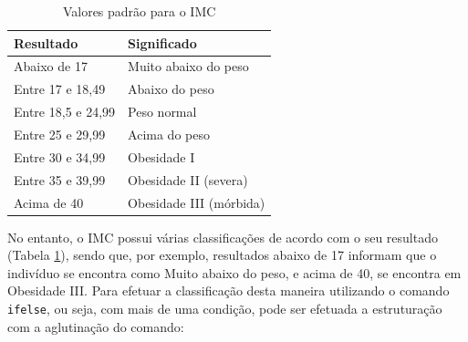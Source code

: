 \documentclass[12pt,brazil,]{book}
\newenvironment{Shaded}{\begin{snugshade}}{\end{snugshade}}
\newcommand{\DecValTok}[1]{\textcolor[rgb]{0.00,0.00,0.81}{#1}}
\newcommand{\FloatTok}[1]{\textcolor[rgb]{0.00,0.00,0.81}{#1}}
\newcommand{\KeywordTok}[1]{\textcolor[rgb]{0.13,0.29,0.53}{\textbf{#1}}}
\newcommand{\NormalTok}[1]{#1}
\newcommand{\OperatorTok}[1]{\textcolor[rgb]{0.81,0.36,0.00}{\textbf{#1}}}
\newcommand{\StringTok}[1]{\textcolor[rgb]{0.31,0.60,0.02}{#1}}
\begin{document}
\begin{table}

\caption{\label{tab:imct}Valores padrão para o IMC}
\centering
\begin{tabular}[t]{l|l}
\hline
Resultado & Significado\\
\hline
Abaixo de 17 & Muito abaixo do peso\\
\hline
Entre 17 e 18,49 & Abaixo do peso\\
\hline
Entre 18,5 e 24,99 & Peso normal\\
\hline
Entre 25 e 29,99 & Acima do peso\\
\hline
Entre 30 e 34,99 & Obesidade I\\
\hline
Entre 35 e 39,99 & Obesidade II (severa)\\
\hline
Acima de 40 & Obesidade III (mórbida)\\
\hline
\end{tabular}
\end{table}

No entanto, o IMC possui várias classificações de acordo com o seu
resultado (Tabela \ref{tab:imct}), sendo que, por exemplo, resultados
abaixo de 17 informam que o indivíduo se encontra como Muito abaixo do
peso, e acima de 40, se encontra em Obesidade III. Para efetuar a
classificação desta maneira utilizando o comando \texttt{ifelse}, ou
seja, com mais de uma condição, pode ser efetuada a estruturação com a
aglutinação do comando:

\begin{Shaded}
\end{Shaded}
\end{document}
